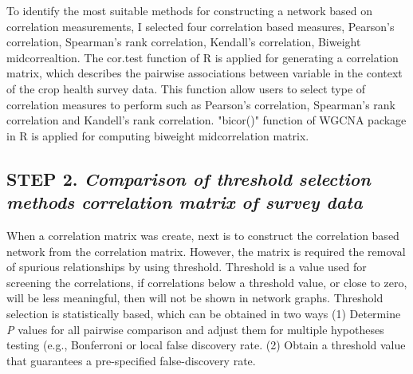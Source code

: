 

To identify the most suitable methods for constructing a network based on correlation measurements, I selected four correlation based measures, Pearson's correlation, Spearman's rank correlation, Kendall's correlation, Biweight midcorrealtion. The cor.test function of R  is applied for generating a correlation matrix, which describes the pairwise associations between variable in the context of the crop health survey data. This function allow users to select type of correlation measures to perform such as Pearson's correlation, Spearman's rank correlation and Kandell's rank correlation. "bicor()" function of WGCNA package  in R is applied for computing biweight midcorrelation matrix. 


\subsection*{\textbf{STEP 2. }\textit{Comparison of threshold selection methods correlation matrix of survey data}} 

When a correlation matrix was create, next is to construct the correlation based network from the correlation matrix. However, the matrix is required the removal of spurious relationships by using threshold. Threshold is a value used for screening the correlations, if correlations  below a threshold value, or close to zero, will be less meaningful, then will not be shown in network graphs. Threshold selection is statistically based, which can be obtained in two ways (1) Determine \textit{P} values for all pairwise comparison and adjust them for multiple hypotheses testing (e.g., Bonferroni or local false discovery rate. (2) Obtain a threshold value that guarantees a pre-specified false-discovery rate.


